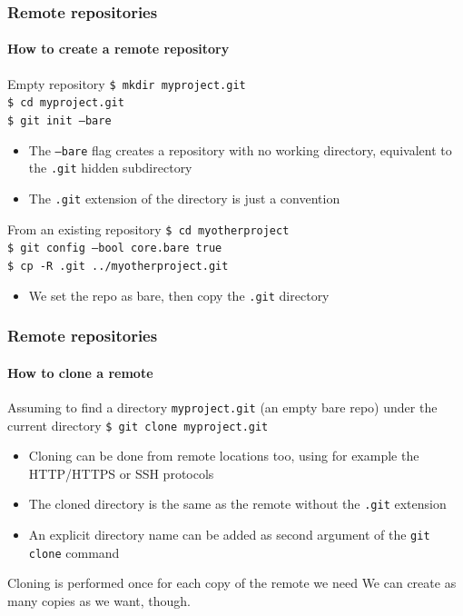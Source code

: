 \begin{frame}
\frametitle{Remote repositories}
\framesubtitle{How to create a remote repository}

\begin{block}{Empty repository}
\texttt{\$ mkdir myproject.git} \\
\texttt{\$ cd myproject.git} \\
\texttt{\$ git init ---bare}

\begin{itemize}
\item The \texttt{---bare} flag creates a repository with no working directory, equivalent to the \texttt{.git} hidden subdirectory
\item The \texttt{.git} extension of the directory is just a convention
\end{itemize}
\end{block}

\begin{block}{From an existing repository}
\texttt{\$ cd myotherproject} \\
\texttt{\$ git config ---bool core.bare true} \\
\texttt{\$ cp -R .git ../myotherproject.git}

\begin{itemize}
\item We set the repo as bare, then copy the \texttt{.git} directory
\end{itemize}
\end{block}

\end{frame}

\begin{frame}
\frametitle{Remote repositories}
\framesubtitle{How to clone a remote}

\begin{block}{Assuming to find a directory \texttt{myproject.git} (an empty bare repo) under the current directory}
\texttt{\$ git clone myproject.git} 

\begin{itemize}
\item Cloning can be done from remote locations too, using for example the HTTP/HTTPS or SSH protocols
\item The cloned directory is the same as the remote without the \texttt{.git} extension
\item An explicit directory name can be added as second argument of the \texttt{git clone} command
\end{itemize}
\end{block}

\begin{block}{Cloning is performed once for each copy of the remote we need}
We can create as many copies as we want, though.
\end{block}

\end{frame}

